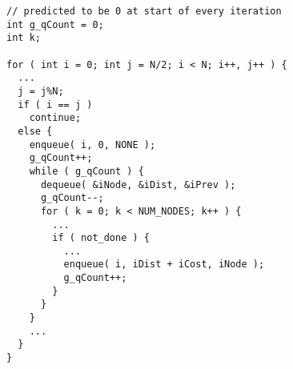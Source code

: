 \begin{lstlisting}[morekeywords={g_qCount},belowskip=0pt]
// predicted to be 0 at start of every iteration
int g_qCount = 0;
int k;

for ( int i = 0; int j = N/2; i < N; i++, j++ ) {
  ...
  j = j%N;
  if ( i == j )
    continue;
  else {
    enqueue( i, 0, NONE );
    g_qCount++;
    while ( g_qCount ) {
      dequeue( &iNode, &iDist, &iPrev );
      g_qCount--;
      for ( k = 0; k < NUM_NODES; k++ ) {
        ...
        if ( not_done ) {
          ...
          enqueue( i, iDist + iCost, iNode );
          g_qCount++;
        }
      }
    }
    ...
  }
}

\end{lstlisting}
